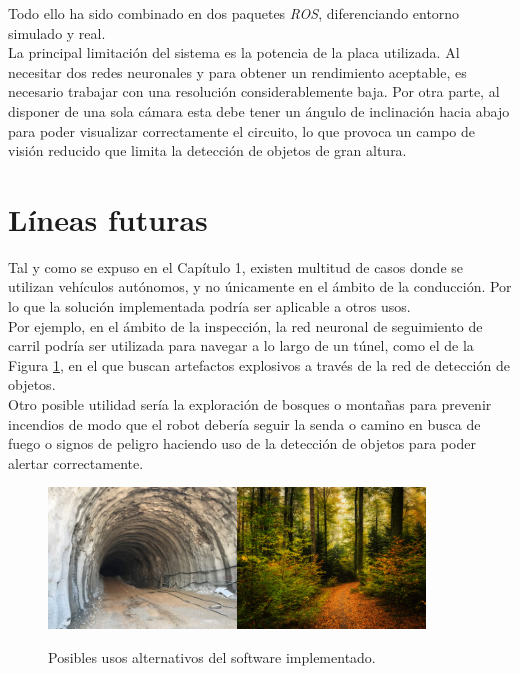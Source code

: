 Todo ello ha sido combinado en dos paquetes \textit{ROS}, diferenciando entorno simulado y real.\\

La principal limitación del sistema es la potencia de la placa utilizada. Al necesitar dos redes neuronales y para obtener un rendimiento aceptable, es necesario trabajar con una resolución considerablemente baja. Por otra parte, al disponer de una sola cámara esta debe tener un ángulo de inclinación hacia abajo para poder visualizar correctamente el circuito, lo que provoca un campo de visión reducido que limita la detección de objetos de gran altura.\\

\section{Líneas futuras}
\label{section:future}
Tal y como se expuso en el Capítulo 1, existen multitud de casos donde se utilizan vehículos autónomos, y no únicamente en el ámbito de la conducción. Por lo que la solución implementada podría ser aplicable a otros usos.\\ 

Por ejemplo, en el ámbito de la inspección, la red neuronal de seguimiento de carril podría ser utilizada para navegar a lo largo de un túnel, como el de la Figura \ref{fig:moreusages}, en el que buscan artefactos explosivos a través de la red de detección de objetos.\\

Otro posible utilidad sería la exploración de bosques o montañas para prevenir incendios de modo que el robot debería seguir la senda o camino en busca de fuego o signos de peligro haciendo uso de la detección de objetos para poder alertar correctamente.\\

\begin{figure} [h!]
	\begin{center}
		\includegraphics[width=5cm]{figs/tunel}\hspace{0.5cm}\includegraphics[width=5cm]{figs/forest}
	\end{center}
	\caption{Posibles usos alternativos del software implementado.}
	\label{fig:moreusages}
\end{figure}\

